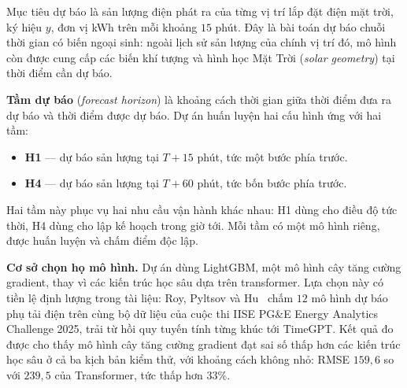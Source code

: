 \documentclass[12pt, a4paper]{report}
\begin{document}
Mục tiêu dự báo là sản lượng điện phát ra của từng vị trí lắp đặt điện mặt trời, ký hiệu
$y$, đơn vị kWh trên mỗi khoảng $15$ phút. Đây là bài toán dự báo chuỗi thời gian có
biến ngoại sinh: ngoài lịch sử sản lượng của chính vị trí đó, mô hình còn được cung cấp
các biến khí tượng và hình học Mặt Trời (\textit{solar geometry}) tại thời điểm cần dự báo.

\textbf{Tầm dự báo} (\textit{forecast horizon}) là khoảng cách thời gian giữa thời
điểm đưa ra dự báo và thời điểm được dự báo. Dự án huấn luyện hai cấu hình ứng với hai
tầm:

\begin{itemize}
    \item \textbf{H1} --- dự báo sản lượng tại $T + 15$ phút, tức một bước phía trước.
    \item \textbf{H4} --- dự báo sản lượng tại $T + 60$ phút, tức bốn bước phía trước.
\end{itemize}

Hai tầm này phục vụ hai nhu cầu vận hành khác nhau: H1 dùng cho điều độ tức thời, H4
dùng cho lập kế hoạch trong giờ tới. Mỗi tầm có một mô hình riêng, được huấn luyện và
chấm điểm độc lập.

\textbf{Cơ sở chọn họ mô hình.} Dự án dùng LightGBM, một mô hình cây tăng cường
gradient, thay vì các kiến trúc học sâu dựa trên transformer. Lựa chọn này có tiền
lệ định lượng trong tài liệu: Roy, Pyltsov và Hu~\cite{roy2025hourly} chấm $12$ mô hình
dự báo phụ tải điện trên cùng bộ dữ liệu của cuộc thi IISE PG\&E Energy Analytics
Challenge 2025, trải từ hồi quy tuyến tính từng khúc tới TimeGPT. Kết quả đo được cho
thấy mô hình cây tăng cường gradient đạt sai số thấp hơn các kiến trúc học sâu ở cả ba
kịch bản kiểm thử, với khoảng cách không nhỏ: RMSE $159{,}6$ so với $239{,}5$ của
Transformer, tức thấp hơn $33\%$.

\begin{table}[htbp]
\centering

\small
{}
\caption[Sai số RMSE trích từ Bảng $4$ của Roy, Pyltsov và Hu, chỉ số càng nhỏ càng tốt]{Sai số RMSE trích từ Bảng $4$ của Roy, Pyltsov và Hu~\cite{roy2025hourly}, chỉ số
càng nhỏ càng tốt. Cột XGBoost là mô hình cây tăng cường gradient, các cột còn lại là kiến
trúc học sâu. Dấu $\times$ là cấu hình bài báo không chạy được.}
\label{tab:roy_rmse}
\end{table}
\end{document}
